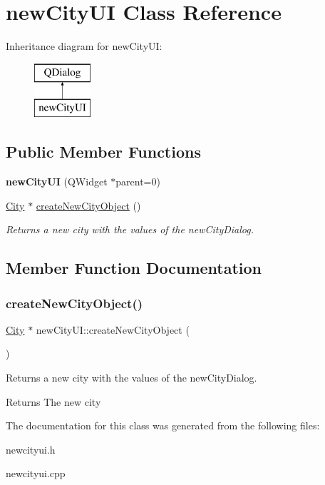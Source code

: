 \hypertarget{classnew_city_u_i}{}\section{new\+City\+UI Class Reference}
\label{classnew_city_u_i}
Inheritance diagram for new\+City\+UI\+:\begin{figure}[H]
\begin{center}
\leavevmode
\includegraphics[height=2.000000cm]{classnew_city_u_i}
\end{center}
\end{figure}
\subsection*{Public Member Functions}
\begin{DoxyCompactItemize}
\item 
\mbox{\label{classnew_city_u_i_ac4cce3418cc0a4a7b26f471ce5d38da1}} 
{\bfseries new\+City\+UI} (Q\+Widget $\ast$parent=0)
\item 
\hyperlink{class_city}{City} $\ast$ \hyperlink{classnew_city_u_i_ab56f36b8660d9b23280ed3e86927b3c1}{create\+New\+City\+Object} ()
\begin{DoxyCompactList}\small\item\em Returns a new city with the values of the new\+City\+Dialog. \end{DoxyCompactList}\end{DoxyCompactItemize}


\subsection{Member Function Documentation}
\mbox{\label{classnew_city_u_i_ab56f36b8660d9b23280ed3e86927b3c1}} 
\subsubsection{\texorpdfstring{create\+New\+City\+Object()}{createNewCityObject()}}
{\footnotesize\ttfamily \hyperlink{class_city}{City} $\ast$ new\+City\+U\+I\+::create\+New\+City\+Object (\begin{DoxyParamCaption}{ }\end{DoxyParamCaption})}



Returns a new city with the values of the new\+City\+Dialog. 

\begin{DoxyReturn}{Returns}
The new city 
\end{DoxyReturn}


The documentation for this class was generated from the following files\+:\begin{DoxyCompactItemize}
\item 
newcityui.\+h\item 
newcityui.\+cpp\end{DoxyCompactItemize}
